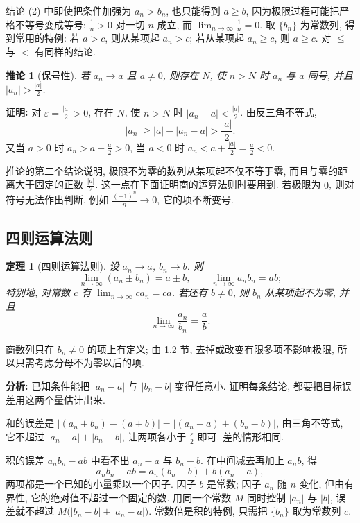 \documentclass[UTF8,openany]{ctexbook}
\theoremstyle{chinesetextbook}
\newtheorem{theorem}{定理}[section]
\newenvironment{cnproof}{\par\indent\textbf{证明:} \ignorespaces}{\par}
\newtheorem*{corollarysingle}{推论}
\begin{document}
结论 (2) 中即使把条件加强为 $a_n>b_n$, 也只能得到 $a\ge b$, 因为极限过程可能把严格不等号变成等号: $\displaystyle\frac1n>0$ 对一切 $n$ 成立, 而 $\displaystyle\lim_{n\to\infty}\frac1n=0$. 取 $\{b_n\}$ 为常数列, 得到常用的特例: 若 $a>c$, 则从某项起 $a_n>c$; 若从某项起 $a_n\ge c$, 则 $a\ge c$. 对 $\le$ 与 $<$ 有同样的结论.
\begin{corollarysingle}[保号性]
若 $a_n\to a$ 且 $a\ne0$, 则存在 $N$, 使 $n>N$ 时 $a_n$ 与 $a$ 同号, 并且 $\displaystyle|a_n|>\frac{|a|}2$.
\end{corollarysingle}
\begin{cnproof}
对 $\displaystyle\varepsilon=\frac{|a|}2>0$, 存在 $N$, 使 $n>N$ 时 $\displaystyle|a_n-a|<\frac{|a|}2$. 由反三角不等式,
\[
|a_n|\ge|a|-|a_n-a|>\frac{|a|}2.
\]
又当 $a>0$ 时 $\displaystyle a_n>a-\frac a2>0$, 当 $a<0$ 时 $\displaystyle a_n<a+\frac{|a|}2=\frac a2<0$.
\end{cnproof}
推论的第二个结论说明, 极限不为零的数列从某项起不仅不等于零, 而且与零的距离大于固定的正数 $\displaystyle\frac{|a|}2$. 这一点在下面证明商的运算法则时要用到. 若极限为 $0$, 则对符号无法作出判断, 例如 $\displaystyle\frac{(-1)^n}n\to0$, 它的项不断变号.
\subsection{四则运算法则}
\begin{theorem}[四则运算法则]
设 $a_n\to a$, $b_n\to b$. 则
\[
\lim_{n\to\infty}(a_n\pm b_n)=a\pm b,\qquad \lim_{n\to\infty}a_nb_n=ab;
\]
特别地, 对常数 $c$ 有 $\displaystyle\lim_{n\to\infty}ca_n=ca$. 若还有 $b\ne0$, 则 $b_n$ 从某项起不为零, 并且
\[
\lim_{n\to\infty}\frac{a_n}{b_n}=\frac ab.
\]
\end{theorem}
商数列只在 $b_n\ne0$ 的项上有定义; 由 1.2 节, 去掉或改变有限多项不影响极限, 所以只需考虑分母不为零以后的项.

\par\indent\textbf{分析:} 已知条件能把 $|a_n-a|$ 与 $|b_n-b|$ 变得任意小. 证明每条结论, 都要把目标误差用这两个量估计出来.

和的误差是 $|(a_n+b_n)-(a+b)|=|(a_n-a)+(b_n-b)|$, 由三角不等式, 它不超过 $|a_n-a|+|b_n-b|$, 让两项各小于 $\displaystyle\frac\varepsilon2$ 即可. 差的情形相同.

积的误差 $a_nb_n-ab$ 中看不出 $a_n-a$ 与 $b_n-b$. 在中间减去再加上 $a_nb$, 得
\[
a_nb_n-ab=a_n(b_n-b)+b(a_n-a),
\]
两项都是一个已知的小量乘以一个因子. 因子 $b$ 是常数; 因子 $a_n$ 随 $n$ 变化, 但由有界性, 它的绝对值不超过一个固定的数. 用同一个常数 $M$ 同时控制 $|a_n|$ 与 $|b|$, 误差就不超过 $M\bigl(|b_n-b|+|a_n-a|\bigr)$. 常数倍是积的特例, 只需把 $\{b_n\}$ 取为常数列 $c$.
\end{document}
